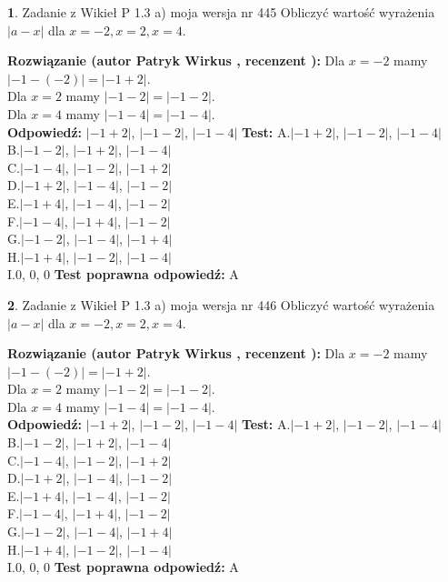 \documentclass[12pt, a4paper]{article}
\theoremstyle{definition} %
\newtheorem{zad}{}
\newcommand{\zadStart}[1]{\begin{zad}#1\newline}
\newcommand{\zadStop}{\end{zad}}
\newcommand{\rozwStart}[2]{\noindent \textbf{Rozwiązanie (autor #1 , recenzent #2): }\newline}
\newcommand{\rozwStop}{\newline}
\newcommand{\odpStart}{\noindent \textbf{Odpowiedź:}\newline}
\newcommand{\odpStop}{\newline}
\newcommand{\testStart}{\noindent \textbf{Test:}\newline}
\newcommand{\testStop}{\newline}
\newcommand{\kluczStart}{\noindent \textbf{Test poprawna odpowiedź:}\newline}
\newcommand{\kluczStop}{\newline}
\begin{document}
\zadStart{Zadanie z Wikieł P 1.3 a) moja wersja nr 445}
Obliczyć wartość wyrażenia $|a - x|$ dla $x=-2,x=2,x=4$.
\zadStop
\rozwStart{Patryk Wirkus}{}
Dla $x = -2$ mamy $|-1 - (-2)| = |-1 + 2|$.\\
Dla $x = 2$ mamy $|-1 - 2| = |-1 - 2|$.\\
Dla $x = 4$ mamy $|-1 - 4| = |-1 - 4|$.\\
\rozwStop
\odpStart
$|-1 + 2|$, $|-1 - 2|$, $|-1 - 4|$
\odpStop
\testStart
A.$|-1 + 2|$, $|-1 - 2|$, $|-1 - 4|$\\
B.$|-1 - 2|$, $|-1 + 2|$, $|-1 - 4|$\\
C.$|-1 - 4|$, $|-1 - 2|$, $|-1 + 2|$\\
D.$|-1 + 2|$, $|-1 - 4|$, $|-1 - 2|$\\
E.$|-1 + 4|$, $|-1 - 4|$, $|-1 - 2|$\\
F.$|-1 - 4|$, $|-1 + 4|$, $|-1 - 2|$\\
G.$|-1 - 2|$, $|-1 - 4|$, $|-1 + 4|$\\
H.$|-1 + 4|$, $|-1 - 2|$, $|-1 - 4|$\\
I.$0$, $0$, $0$
\testStop
\kluczStart
A
\kluczStop



\zadStart{Zadanie z Wikieł P 1.3 a) moja wersja nr 446}
Obliczyć wartość wyrażenia $|a - x|$ dla $x=-2,x=2,x=4$.
\zadStop
\rozwStart{Patryk Wirkus}{}
Dla $x = -2$ mamy $|-1 - (-2)| = |-1 + 2|$.\\
Dla $x = 2$ mamy $|-1 - 2| = |-1 - 2|$.\\
Dla $x = 4$ mamy $|-1 - 4| = |-1 - 4|$.\\
\rozwStop
\odpStart
$|-1 + 2|$, $|-1 - 2|$, $|-1 - 4|$
\odpStop
\testStart
A.$|-1 + 2|$, $|-1 - 2|$, $|-1 - 4|$\\
B.$|-1 - 2|$, $|-1 + 2|$, $|-1 - 4|$\\
C.$|-1 - 4|$, $|-1 - 2|$, $|-1 + 2|$\\
D.$|-1 + 2|$, $|-1 - 4|$, $|-1 - 2|$\\
E.$|-1 + 4|$, $|-1 - 4|$, $|-1 - 2|$\\
F.$|-1 - 4|$, $|-1 + 4|$, $|-1 - 2|$\\
G.$|-1 - 2|$, $|-1 - 4|$, $|-1 + 4|$\\
H.$|-1 + 4|$, $|-1 - 2|$, $|-1 - 4|$\\
I.$0$, $0$, $0$
\testStop
\kluczStart
A
\kluczStop
\end{document}
